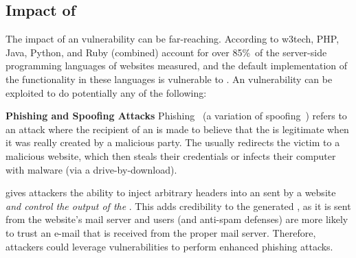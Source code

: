 \subsection{Impact of \ehi}


The impact of an \ehi vulnerability can be far-reaching.
According to w3tech, PHP, Java, Python, and Ruby (combined) account
for over 85\%\, of the server-side programming languages of websites
measured, and the default implementation of the \email functionality
in these languages is vulnerable to \ehi. An \ehi vulnerability can be
exploited to do potentially any of the following:





		

\noindent \textbf{Phishing and Spoofing Attacks}
Phishing~\cite{phishing} (a variation of
spoofing~\cite{spoofing_attack}) refers to an attack where the
recipient of an \email is made to believe that the \email is
legitimate when it was really created by a malicious party. The \email
usually redirects the victim to a malicious website, which then steals
their credentials or infects their computer with malware (via a
drive-by-download).
    
    \ehi gives attackers the ability to inject arbitrary headers into an \email sent by a website \emph{and control the output of the \email}. This adds credibility to the generated \email, as it is sent from the website's mail server and users (and anti-spam defenses) are more likely to trust an e-mail that is received from the proper mail server. Therefore, attackers could leverage \ehi vulnerabilities to perform enhanced phishing attacks. 
	
